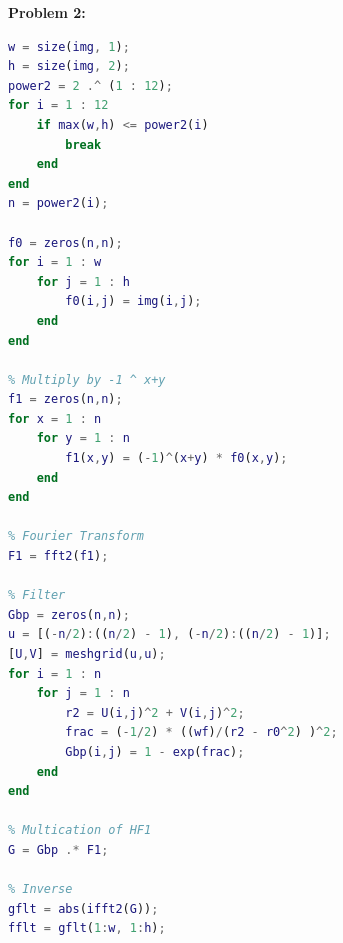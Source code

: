 \documentclass[11pt]{article}
\newenvironment{problem}[1]{\textbf{Problem #1: }}{\newpage}
\begin{document}
\begin{problem}{2}
\begin{enumerate}[label = (\alph*)]
\begin{lstlisting}[language=Matlab]
% Padding for Size
w = size(img, 1);
h = size(img, 2);
power2 = 2 .^ (1 : 12);
for i = 1 : 12
	if max(w,h) <= power2(i)
		break
	end
end
n = power2(i);

f0 = zeros(n,n);
for i = 1 : w
	for j = 1 : h
		f0(i,j) = img(i,j);
	end
end

% Multiply by -1 ^ x+y
f1 = zeros(n,n);
for x = 1 : n
	for y = 1 : n
		f1(x,y) = (-1)^(x+y) * f0(x,y);
	end
end

% Fourier Transform
F1 = fft2(f1);

% Filter 
Gbp = zeros(n,n);
u = [(-n/2):((n/2) - 1), (-n/2):((n/2) - 1)];
[U,V] = meshgrid(u,u);
for i = 1 : n
	for j = 1 : n
		r2 = U(i,j)^2 + V(i,j)^2;
		frac = (-1/2) * ((wf)/(r2 - r0^2) )^2;
		Gbp(i,j) = 1 - exp(frac);
	end
end

% Multication of HF1
G = Gbp .* F1;

% Inverse
gflt = abs(ifft2(G));
fflt = gflt(1:w, 1:h);



\end{lstlisting}
\end{enumerate}
\end{problem}
\end{document}
